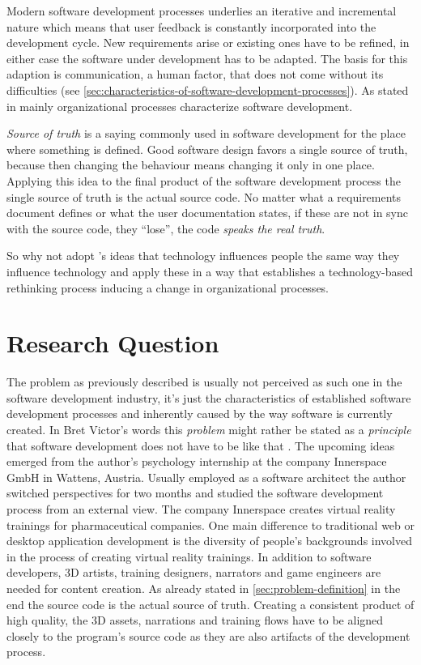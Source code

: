 Modern software development processes underlies an iterative and incremental nature \autocite{mayr_projekt_2005} which means that user feedback is constantly incorporated into the development cycle.
New requirements arise or existing ones have to be refined, in either case the software under development has to be adapted.
The basis for this adaption is communication, a human factor, that does not come without its difficulties (see \cref{sec:characteristics-of-software-development-processes}).
As stated in  \autocite{curtis_psychology_1990} mainly organizational processes characterize software development.

\emph{Source of truth} is a saying commonly used in software development for the place where something is defined.
Good software design favors a single source of truth, because then changing the behaviour means changing it only in one place.
Applying this idea to the final product of the software development process the single source of truth is the actual source code.
No matter what a requirements document defines or what the user documentation states, if these are not in sync with the source code, they ``lose'', the code \emph{speaks the real truth}.

So why not adopt \citeauthor{schraube_ich_2012}'s ideas \autocite{schraube_ich_2012} that technology influences people the same way they influence technology and apply these in a way that establishes a technology-based rethinking process inducing a change in organizational processes.


\section{Research Question}
The problem as previously described is usually not perceived as such one in the software development industry, it's just the characteristics of established software development processes and inherently caused by the way software is currently created.
In Bret Victor's words this \emph{problem} might rather be stated as a \emph{principle} that software development does not have to be like that \autocite{victor_inventing_2012}.
The upcoming ideas emerged from the author's psychology internship at the company Innerspace GmbH in Wattens, Austria.
Usually employed as a software architect the author switched perspectives for two months and studied the software development process from an external view.
The company Innerspace creates virtual reality trainings for pharmaceutical companies.
One main difference to traditional web or desktop application development is the diversity of people's backgrounds involved in the process of creating virtual reality trainings.
In addition to software developers, 3D artists, training designers, narrators and game engineers are needed for content creation.
As already stated in \cref{sec:problem-definition} in the end the source code is the actual source of truth.
Creating a consistent product of high quality, the 3D assets, narrations and training flows have to be aligned closely to the program's source code as they are also artifacts of the development process.

